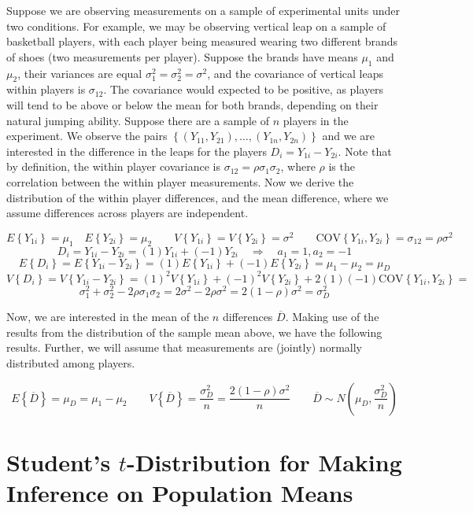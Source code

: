 \documentclass[
]{book}
\begin{document}
Suppose we are observing measurements on a sample of experimental units
under two conditions. For example, we may be observing vertical leap on
a sample of basketball players, with each player being measured wearing
two different brands of shoes (two measurements per player). Suppose the
brands have means \(\mu_1\) and \(\mu_2\), their variances are equal
\(\sigma_1^2=\sigma_2^2=\sigma^2\), and the covariance of vertical leaps
within players is \(\sigma_{12}\). The covariance would expected to be
positive, as players will tend to be above or below the mean for both
brands, depending on their natural jumping ability. Suppose there are a
sample of \(n\) players in the experiment. We observe the pairs
\(\left\{\left(Y_{11},Y_{21}\right),\ldots,\left(Y_{1n},Y_{2n}\right)\right\}\)
and we are interested in the difference in the leaps for the players
\(D_i=Y_{1i}-Y_{2i}\). Note that by definition, the within player
covariance is \(\sigma_{12}=\rho\sigma_1\sigma_2\), where \(\rho\) is
the correlation between the within player measurements. Now we derive
the distribution of the within player differences, and the mean
difference, where we assume differences across players are independent.

\[
E\left\{Y_{1i}\right\}=\mu_1 \quad E\left\{Y_{2i}\right\}=\mu_2 \qquad
V\left\{Y_{1i}\right\}=V\left\{Y_{2i}\right\}=\sigma^2 \qquad
\mbox{COV}\left\{Y_{1i},Y_{2i}\right\}=\sigma_{12}=\rho\sigma^2
\] \[
D_i=Y_{1i}-Y_{2i}=(1)Y_{1i} + (-1)Y_{2i} \quad \Rightarrow \quad a_1=1,a_2=-1
\] \[
E\left\{D_i\right\}=E\left\{Y_{1i}-Y_{2i}\right\}=
(1)
E\left\{Y_{1i}\right\}+(-1)E\left\{Y_{2i}\right\}=\mu_1-\mu_2=\mu_D
\] \[
V\left\{D_i\right\}=V\left\{Y_{1i}-Y_{2i}\right\}=
(1)^2V\left\{Y_{1i}\right\}+(-1)^2V\left\{Y_{2i}\right\}+
2(1)(-1)\mbox{COV}\left\{Y_{1i},Y_{2i}\right\}=
\] \[
\sigma_1^2+\sigma_2^2-2\rho\sigma_1\sigma_2=2\sigma^2-2\rho\sigma^2=
2(1-\rho)\sigma^2=\sigma_D^2
\]

Now, we are interested in the mean of the \(n\) differences
\(\overline{D}\). Making use of the results from the distribution of the
sample mean above, we have the following results. Further, we will
assume that measurements are (jointly) normally distributed among
players.

\[
E\left\{\overline{D}\right\}=\mu_D=\mu_1-\mu_2 \qquad 
V\left\{\overline{D}\right\}=\frac{\sigma_D^2}{n}=\frac{2(1-\rho)\sigma^2}{n} \qquad
\overline{D}\sim N\left(\mu_D,\frac{\sigma_D^2}{n}\right)
\]

\section{\texorpdfstring{Student's \(t\)-Distribution for Making
Inference on Population
Means}{Student's t-Distribution for Making Inference on Population Means}}\label{students-t-distribution-for-making-inference-on-population-means}
\end{document}
